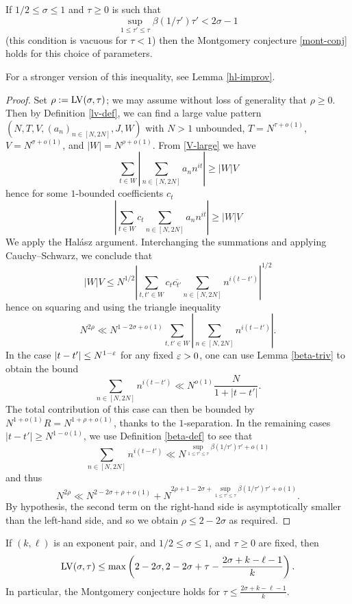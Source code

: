 \begin{theorem}\label{montgomery-lv} If $1/2 \leq \sigma \leq 1$ and $\tau \geq 0$ is such that
\begin{equation}\label{tab}
\sup_{1 \leq \tau' \leq \tau} \beta(1/\tau') \tau' < 2\sigma - 1
\end{equation}
(this condition is vacuous for $\tau < 1$) then the Montgomery conjecture \eqref{mont-conj} holds for this choice of parameters.
\end{theorem}

For a stronger version of this inequality, see Lemma \ref{hl-improv}.

\begin{proof}  Set $\rho := \mathrm{LV}(\sigma,\tau)$; we may assume without loss of generality that $\rho \geq 0$.  Then by Definition \ref{lv-def}, we can find a large value pattern $(N,T,V,(a_n)_{n \in [N,2N]},J,W)$  with $N > 1$ unbounded, $T = N^{\tau + o(1)}$, $V = N^{\sigma + o(1)}$, and $|W| = N^{\rho+o(1)}$.  From \eqref{V-large} we have
$$ \sum_{t \in W} \left|\sum_{n \in [N,2N]} a_n n^{it} \right| \geq |W|V$$
hence for some $1$-bounded coefficients $c_t$
$$ \left|\sum_{t \in W} c_t \sum_{n \in [N,2N]} a_n n^{it} \right| \geq |W|V$$
We apply the Hal\'asz argument. Interchanging the summations and applying Cauchy--Schwarz, we conclude that
$$ |W|V \leq N^{1/2} \left|\sum_{t, t' \in W} c_t \overline{c_{t'}} \sum_{n \in [N,2N]} n^{i(t-t')} \right|^{1/2}$$
hence on squaring and using the triangle inequality
$$ N^{2\rho} \ll N^{1-2\sigma+o(1)} \sum_{t,t' \in W} \left|\sum_{n \in [N,2N]} n^{i(t-t')} \right|.$$
In the case $|t - t'| \leq N^{1-\varepsilon}$ for any fixed $\varepsilon>0$, one can use Lemma \ref{beta-triv} to obtain the bound
$$ \sum_{n \in [N,2N]} n^{i(t-t')} \ll N^{o(1)} \frac{N}{1 + |t - t'|}.$$
The total contribution of this case can then be bounded by $N^{1+o(1)} R = N^{1+\rho+o(1)}$, thanks to the $1$-separation.
In the remaining cases $|t - t'| \geq N^{1-o(1)}$, we use Definition \ref{beta-def} to see that
$$ \sum_{n \in [N,2N]} n^{i(t-t')} \ll N^{\sup_{1 \leq \tau' \leq \tau} \beta(1/\tau') \tau' + o(1)}$$
and thus
$$ N^{2\rho} \ll N^{2-2\sigma+\rho+o(1)} + N^{2\rho + 1-2\sigma+\sup_{1 \leq \tau' \leq \tau} \beta(1/\tau') \tau' + o(1)}.$$
By hypothesis, the second term on the right-hand side is asymptotically smaller than the left-hand side, and so we obtain $\rho \leq 2-2\sigma$ as required.
\end{proof}

\begin{corollary}\label{exp-lv}  If $(k,\ell)$ is an exponent pair, and $1/2 \leq \sigma \leq 1$, and $\tau \geq 0$ are fixed, then
$$\mathrm{LV}(\sigma,\tau) \leq \max\left( 2-2\sigma, 2 - 2\sigma + \tau - \frac{2\sigma+k-\ell-1}{k} \right).$$
In particular, the Montgomery conjecture holds for $\tau \leq \frac{2\sigma+k-\ell-1}{k}$.
\end{corollary}

